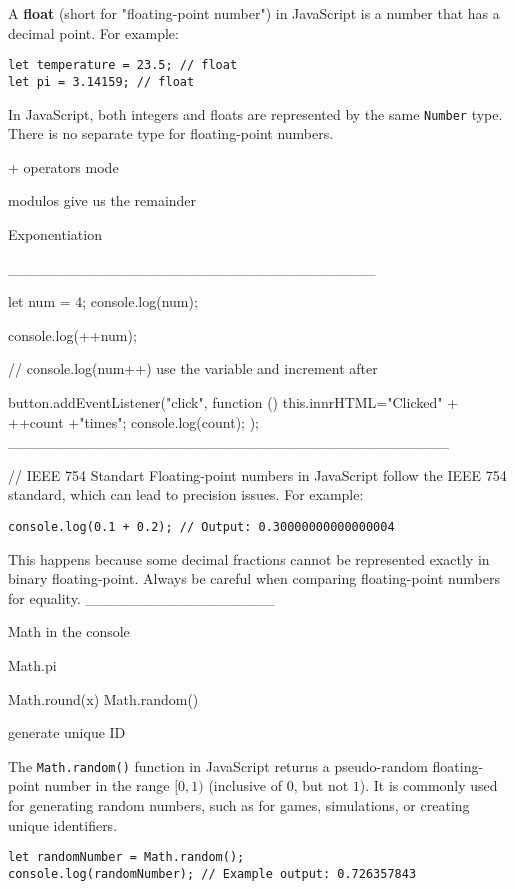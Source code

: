 A \textbf{float} (short for "floating-point number") in JavaScript is a number that has a decimal point. For example:

\begin{verbatim}
let temperature = 23.5; // float
let pi = 3.14159; // float
\end{verbatim}

In JavaScript, both integers and floats are represented by the same \texttt{Number} type. There is no separate type for floating-point numbers.

+ operators
mode

modulos
give us the remainder

Exponentiation

___________________________________

let num = 4;
console.log(num);

console.log(++num);

// console.log(num++) use the variable and increment after

button.addEventListener("click", function (){
    this.innrHTML="Clicked" + ++count +"times";
    console.log(count);
});
__________________________________________

// IEEE 754 Standart
Floating-point numbers in JavaScript follow the IEEE 754 standard, which can lead to precision issues. For example:

\begin{verbatim}
console.log(0.1 + 0.2); // Output: 0.30000000000000004
\end{verbatim}

This happens because some decimal fractions cannot be represented exactly in binary floating-point. Always be careful when comparing floating-point numbers for equality.
__________________

Math in the console

Math.pi

Math.round(x)
Math.random()

generate unique ID

The \texttt{Math.random()} function in JavaScript returns a pseudo-random floating-point number in the range $[0, 1)$ (inclusive of $0$, but not $1$). It is commonly used for generating random numbers, such as for games, simulations, or creating unique identifiers.

\begin{verbatim}
let randomNumber = Math.random();
console.log(randomNumber); // Example output: 0.726357843
\end{verbatim}


